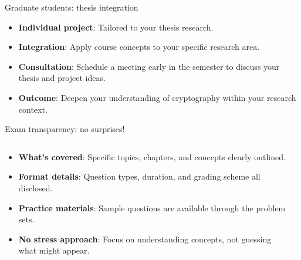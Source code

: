 \documentclass[aspectratio=169, lualatex, handout]{beamer}
\begin{document}
\begin{frame}{Graduate students: thesis integration}
	\vspace{0.1cm}
	\begin{itemize}[<+->]
		\item \textbf{Individual project}: Tailored to your thesis research.
		\item \textbf{Integration}: Apply course concepts to your specific research area.
		\item \textbf{Consultation}: Schedule a meeting early in the semester to discuss your thesis and project ideas.
		\item \textbf{Outcome}: Deepen your understanding of cryptography within your research context.
	\end{itemize}
\end{frame}

\begin{frame}{Exam transparency: no surprises!}
	\begin{columns}[c]
		\begin{column}{0.5\textwidth}
			\begin{itemize}[<+->]
				\item \textbf{What's covered}: Specific topics, chapters, and concepts clearly outlined.
				\item \textbf{Format details}: Question types, duration, and grading scheme all disclosed.
				\item \textbf{Practice materials}: Sample questions are available through the problem sets.
				\item \textbf{No stress approach}: Focus on understanding concepts, not guessing what might appear.
			\end{itemize}
		\end{column}
		\begin{column}{0.5\textwidth}
		\end{column}
	\end{columns}
\end{frame}
\end{document}
